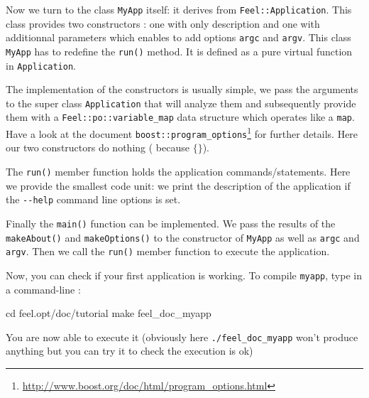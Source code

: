 Now we turn to the class \lstinline!MyApp! itself: it derives from
\lstinline!Feel::Application!. This class provides two constructors : one with only description and one with additionnal parameters which enables to add options 
\lstinline!argc! and \lstinline!argv!.
This class \lstinline!MyApp! has to redefine the \lstinline!run()! method. It is defined as a pure virtual function in \lstinline!Application!.




The implementation of the constructors is usually simple, we pass the
arguments to the super class \lstinline!Application! that will analyze
them and subsequently provide them with a
\lstinline!Feel::po::variable_map! data structure which operates like
a \lstinline!map!. Have a look at the document \lstinline!boost::program_options!\footnote{\url{http://www.boost.org/doc/html/program_options.html}} for further details. Here our two constructors do nothing ( because $\{ \}$).



The \lstinline!run()! member function holds the application
commands/statements. Here we provide the smallest code unit: we print
the description of the application if the \lstinline!--help! command
line options is set.



Finally the \lstinline!main()! function can be implemented. We pass
the results of the \lstinline!makeAbout()! and
\lstinline!makeOptions()! to the constructor of \lstinline!MyApp! as
well as \lstinline!argc! and \lstinline!argv!. Then we call the
\lstinline!run()! member function to execute the application.



Now, you can check if your first \feel application is working. To compile \lstinline!myapp!, type in a command-line :
\begin{unixcom}
		cd feel.opt/doc/tutorial
		make feel_doc_myapp
\end{unixcom}

You are now able to execute it (obviously here \verb|./feel_doc_myapp| won't produce anything but you can try it to check the execution is ok)

